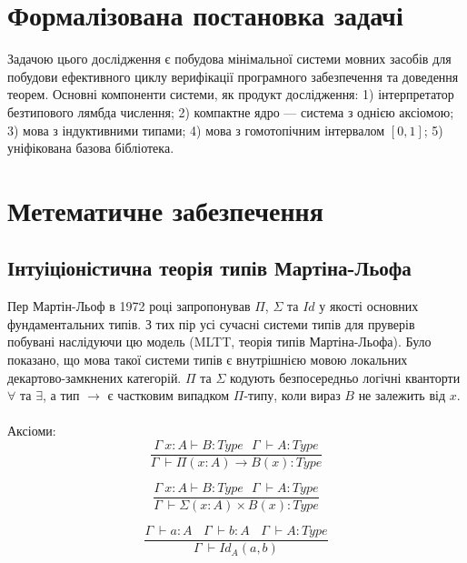 \section{Формалізована постановка задачі}
Задачою цього дослідження є побудова мінімальної системи
мовних засобів для побудови ефективного циклу верифікації програмного
забезпечення та доведення теорем. Основні компоненти системи, як продукт
дослідження: 1) інтерпретатор безтипового лямбда числення;
2) компактне ядро --- система з однією аксіомою;
3) мова з індуктивними типами;
4) мова з гомотопічним інтервалом $[0,1]$;
5) уніфікована базова бібліотека.

\section{Метематичне забезпечення}
\vspace{0.3cm}

\subsection{Інтуіціоністична теорія типів Мартіна-Льофа}
Пер Мартін-Льоф в 1972 році запропонував $\Pi$, $\Sigma$ та $Id$
у якості основних фундаментальних типів. З тих пір усі сучасні системи типів
для пруверів побувані наслідуючи цю модель (MLTT, теорія типів Мартіна-Льофа).
Було показано, що мова такої системи
типів є внутрішнією мовою локальних декартово-замкнених категорій. $\Pi$ та $\Sigma$
кодують безпосередньо логічні кванторти $\forall$ та $\exists$, а тип $\rightarrow$ є
частковим випадком $\Pi$-типу, коли вираз $B$ не залежить від $x$.

\paragraph{}
Аксіоми:
\begin{equation}
\tag{$\Pi$}
\dfrac{\Gamma\ x:A \vdash B : Type\ \ \ \Gamma\ \vdash A : Type}
      {\Gamma\ \vdash \Pi (x : A) \rightarrow B (x) : Type}
\end{equation}

\begin{equation}
\tag{$\Sigma$}
\dfrac{\Gamma\ x:A \vdash B : Type\ \ \ \Gamma\ \vdash A : Type}
      {\Gamma\ \vdash \Sigma (x : A) \times B (x) : Type}
\end{equation}

\begin{equation}
\tag{$Id$}
\dfrac{\Gamma\ \vdash a: A\ \ \ \ \Gamma\ \vdash b: A\ \ \ \ \Gamma\ \vdash A : Type }
      {\Gamma\ \vdash Id_A (a,b)}
\end{equation}

